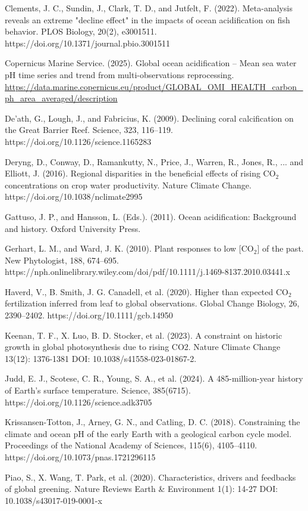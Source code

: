 \documentclass[12pt,paper=a4,DIV=12,parskip=never,chapterprefix=false,headings=standardclasses]{scrreprt}
\begin{document}
Clements, J. C., Sundin, J., Clark, T. D., and Jutfelt, F. (2022). Meta-analysis reveals an extreme "decline effect" in the impacts of ocean acidification on fish behavior. PLOS Biology, 20(2), e3001511. https://doi.org/10.1371/journal.pbio.3001511

Copernicus Marine Service. (2025). Global ocean acidification – Mean sea water pH time series and trend from multi-observations reprocessing. \url{https://data.marine.copernicus.eu/product/GLOBAL_OMI_HEALTH_carbon_ph_area_averaged/description}

De'ath, G., Lough, J., and Fabricius, K. (2009). Declining coral calcification on the Great Barrier Reef. Science, 323, 116–119. https://doi.org/10.1126/science.1165283

Deryng, D., Conway, D., Ramankutty, N., Price, J., Warren, R., Jones, R., ... and Elliott, J. (2016). Regional disparities in the beneficial effects of rising CO$_2$ concentrations on crop water productivity. Nature Climate Change. https://doi.org/10.1038/nclimate2995

Gattuso, J. P., and Hansson, L. (Eds.). (2011). Ocean acidification: Background and history. Oxford University Press.

Gerhart, L. M., and Ward, J. K. (2010). Plant responses to low [CO$_2$] of the past. New Phytologist, 188, 674–695. https://nph.onlinelibrary.wiley.com/doi/pdf/10.1111/j.1469-8137.2010.03441.x

Haverd, V., B. Smith, J. G. Canadell, et al. (2020). Higher than expected CO$_2$ fertilization inferred from leaf to global observations. Global Change Biology, 26, 2390–2402. https://doi.org/10.1111/gcb.14950

Keenan, T. F., X. Luo, B. D. Stocker, et al. (2023). A constraint on historic growth in global photosynthesis due to rising CO2. Nature Climate Change 13(12): 1376-1381 DOI: 10.1038/s41558-023-01867-2.

Judd, E. J., Scotese, C. R., Young, S. A., et al. (2024). A 485-million-year history of Earth's surface temperature. Science, 385(6715). https://doi.org/10.1126/science.adk3705

Krissansen-Totton, J., Arney, G. N., and Catling, D. C. (2018). Constraining the climate and ocean pH of the early Earth with a geological carbon cycle model. Proceedings of the National Academy of Sciences, 115(6), 4105–4110. https://doi.org/10.1073/pnas.1721296115

Piao, S., X. Wang, T. Park, et al. (2020). Characteristics, drivers and feedbacks of global greening. Nature Reviews Earth \& Environment 1(1): 14-27 DOI: 10.1038/s43017-019-0001-x
\end{document}

